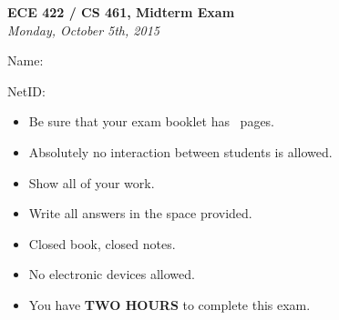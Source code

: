 \documentclass[addpoints,answers]{exam}
\begin{document}
\begin{titlepage}
  \vspace*{\fill}
  \begin{center}
    \Large\textbf{ECE 422 / CS 461, Midterm Exam}\\
    \large\textit{Monday, October 5th, 2015}\\
  \end{center}
  \vspace{.5in}
  \par\large{Name:}\hrulefill\\
  \par\large{NetID:}\hrulefill\\
  \vspace{.5in}
  \begin{itemize}
  \item Be sure that your exam booklet has \numpages\ pages.
  \item Absolutely no interaction between students is allowed.
  \item Show all of your work.
  \item Write all answers in the space provided.
  \item Closed book, closed notes.
  \item No electronic devices allowed.
  \item You have \textbf{TWO HOURS} to complete this exam.
  \end{itemize}
  \vspace*{\fill}
\end{titlepage}
\newpage 

\begin{center}
  \gradetable[v][pages]
\end{center}
\newpage
\end{document}
